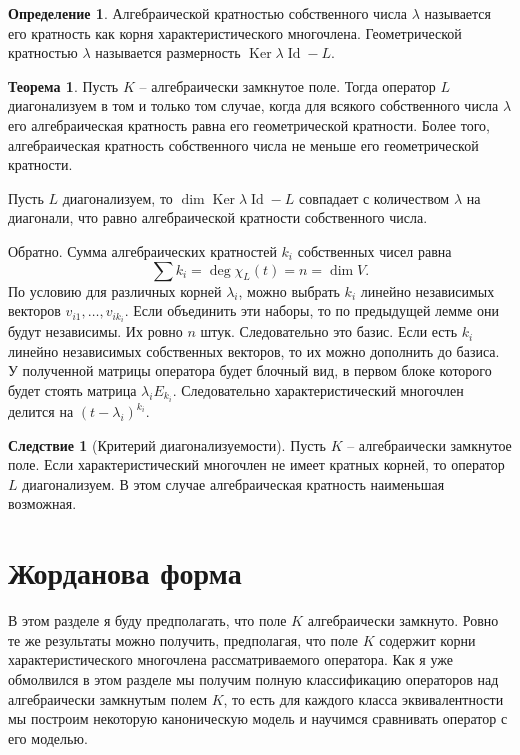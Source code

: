 \documentclass[10pt,a4paper,oneside]{book} %
\theoremstyle{definition}
\newtheorem*{defn}{Определение}
\newtheorem{thm}{Теорема}
\newtheorem{cor}{Следствие}
\newcommand{\id}{\operatorname{Id}}
\DeclareMathOperator{\Ker}{Ker}
\def\thrm{\begin{thm}}
\def\ethrm{\end{thm}}
\def\dfn{\begin{defn}}
\def\edfn{\end{defn}}
\def\crl{\begin{cor}}
\def\ecrl{\end{cor}}
\begin{document}
\dfn Алгебраической кратностью собственного числа $\lambda$ называется его кратность как корня характеристического многочлена. Геометрической кратностью $\lambda$ называется размерность $\Ker \lambda \id - L$.
\edfn

\thrm Пусть $K$ -- алгебраически замкнутое поле.  Тогда оператор $L$ диагонализуем в том и только том случае, когда для всякого собственного числа $\lambda$ его алгебраическая кратность равна его геометрической кратности. Более того, алгебраическая кратность собственного числа не меньше его геометрической кратности.
\ethrm
\proof Пусть $L$ диагонализуем, то $\dim \Ker \lambda \id - L$ совпадает с количеством  $\lambda$ на диагонали, что равно алгебраической кратности собственного числа.

Обратно. Сумма алгебраических кратностей $k_i$ собственных чисел равна $$\sum k_i=\deg \chi_L(t)=n=\dim V.$$
По условию для различных корней $\lambda_i$, можно выбрать $k_i$ линейно независимых векторов $v_{i1},\dots,v_{ik_i}$. Если объединить эти наборы, то по предыдущей лемме они будут независимы. Их ровно $n$ штук. Следовательно это базис.
Если есть $k_i$ линейно независимых собственных векторов, то их можно дополнить до базиса. У полученной матрицы оператора будет блочный вид, в первом блоке которого будет стоять матрица $\lambda_iE_{k_i}$. Следовательно характеристический многочлен делится на $(t-\lambda_i)^{k_i}$.
\endproof



\crl[Критерий диагонализуемости] Пусть $K$ -- алгебраически замкнутое поле. Если характеристический многочлен не имеет кратных корней, то оператор $L$ диагонализуем.
\proof В этом случае алгебраическая кратность наименьшая возможная.
\endproof
\ecrl






\section{Жорданова форма}

В этом разделе я буду предполагать, что  поле $K$ алгебраически замкнуто. Ровно те же результаты можно получить, предполагая, что поле $K$ содержит корни характеристического многочлена рассматриваемого оператора. Как я уже обмолвился в этом разделе мы получим полную классификацию операторов над алгебраически замкнутым полем $K$, то есть для каждого класса эквивалентности мы построим некоторую каноническую модель и научимся сравнивать оператор с его моделью.
\end{document}

